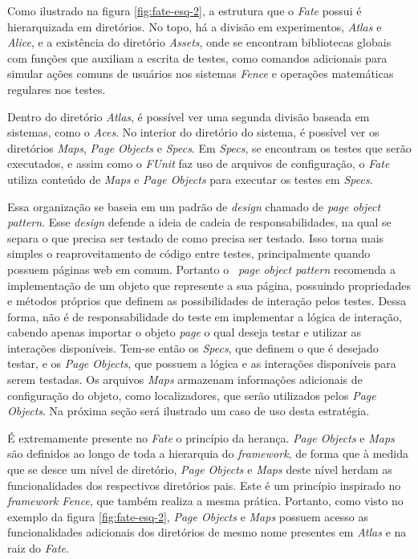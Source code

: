 Como ilustrado na figura \ref{fig:fate-esq-2}, a estrutura que o \emph{Fate} possui é hierarquizada em diretórios. No topo, há a divisão em experimentos, \emph{Atlas} e \emph{Alice}, e a existência do diretório \emph{Assets}, onde se encontram bibliotecas globais com funções que auxiliam a escrita de testes, como comandos adicionais para simular ações comuns de usuários nos sistemas \emph{Fence} e operações matemáticas regulares nos testes.

Dentro do diretório \emph{Atlas}, é possível ver uma segunda divisão baseada em sistemas, como o \emph{Aces}. No interior do diretório do sistema, é possível ver os diretórios \emph{Maps}, \emph{Page Objects} e \emph{Specs}. Em \emph{Specs}, se encontram os testes que serão executados, e assim como o \emph{FUnit} faz uso de arquivos de configuração, o \emph{Fate} utiliza conteúdo de \emph{Maps} e \emph{Page Objects} para executar os testes em \emph{Specs}.

Essa organização se baseia em um padrão de \emph{design} chamado de \emph{page object pattern}. Esse \emph{design} defende a ideia de cadeia de responsabilidades, na qual se separa o que precisa ser testado de como precisa ser testado. Isso torna mais simples o reaproveitamento de código entre testes, principalmente quando possuem páginas web em comum. Portanto o \emph{~page object pattern} recomenda a implementação de um objeto que represente a sua página, possuindo propriedades e métodos próprios que definem as possibilidades de interação pelos testes. Dessa forma, não é de responsabilidade do teste em implementar a lógica de interação, cabendo apenas importar o objeto \emph{page} o qual deseja testar e utilizar as interações disponíveis. Tem-se então os \emph{Specs}, que definem o que é desejado testar, e os \emph{Page Objects}, que possuem a lógica e as interações disponíveis para serem testadas. Os arquivos \emph{Maps} armazenam informações adicionais de configuração do objeto, como localizadores, que serão utilizados pelos \emph{Page Objects}. Na próxima seção será ilustrado um caso de uso desta estratégia.

É extremamente presente no \emph{Fate} o princípio da herança. \emph{Page Objects} e \emph{Maps} são definidos ao longo de toda a hierarquia do \emph{framework}, de forma que à medida que se desce um nível de diretório, \emph{Page Objects} e \emph{Maps} deste nível herdam as funcionalidades dos respectivos diretórios pais. Este é um princípio inspirado no \emph{framework Fence}, que também realiza a mesma prática. Portanto, como visto no exemplo da figura \ref{fig:fate-esq-2}, \emph{Page Objects} e \emph{Maps} possuem acesso as funcionalidades adicionais dos diretórios de mesmo nome presentes em \emph{Atlas} e na raiz do \emph{Fate}.

